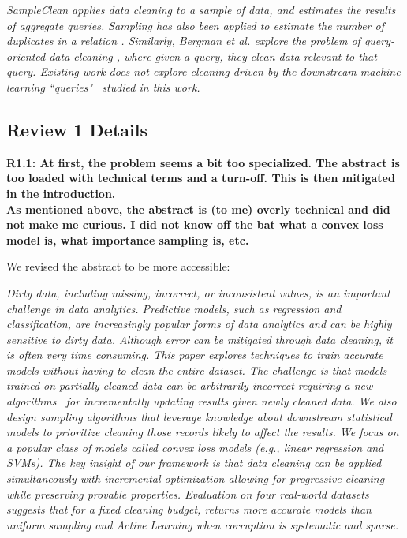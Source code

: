 \emph{SampleClean\cite{wang1999sample} applies data cleaning to a sample of data, and estimates the results of aggregate queries.
Sampling has also been applied to estimate the number of duplicates in a relation \cite{heise2014estimating}. 
Similarly, Bergman et al. explore the problem of query-oriented data cleaning \cite{DBLP:conf/sigmod/BergmanMNT15}, where given a query, they clean data relevant to that query. 
Existing work does not explore cleaning driven by the downstream machine learning ``queries"~ studied in this work.}

\subsection*{Review 1 Details} 

\noindent\textbf{R1.1: At first, the problem seems a bit too specialized. The abstract is too loaded with technical terms and a turn-off. This is then mitigated in the introduction. \\
As mentioned above, the abstract is (to me) overly technical and did not make me curious. I did not know off the bat what a convex loss model is, what importance sampling is, etc.}

\noindent We revised the abstract to be more accessible:


\emph{Dirty data, including missing, incorrect, or inconsistent values, is an important challenge in data analytics.
Predictive models, such as regression and classification, are increasingly popular forms of data analytics and can be highly sensitive to dirty data.
Although error can be mitigated through data cleaning, it is often very time consuming.
This paper explores techniques to train accurate models without having to clean the entire dataset.
The challenge is that models trained on partially cleaned data can be arbitrarily incorrect requiring a new algorithms~ for incrementally updating results given newly cleaned data.
We also design sampling algorithms that leverage knowledge about downstream statistical models to prioritize cleaning those records likely to affect the results.
We focus on a popular class of models called convex loss models (e.g., linear regression and SVMs).
The key insight of our framework is that data cleaning can be applied simultaneously with incremental optimization allowing for progressive cleaning while preserving provable properties.
Evaluation on four real-world datasets suggests that for a fixed cleaning budget, \sys returns more accurate models than uniform sampling and Active Learning when corruption is systematic and sparse.}

